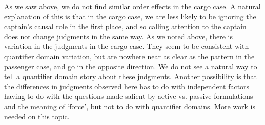 \documentclass{salt}
\begin{document}
As we saw above, we do not find similar order effects in the cargo case. A natural explanation of this is that in the cargo case, we are less likely to be ignoring the captain's causal role in the first place, and so calling attention to the captain does not change judgments in the same way. As we noted above, there is variation in the judgments in the cargo case. They seem to be consistent with quantifier domain variation, but are nowhere near as clear as the pattern in the passenger case, and go in the opposite direction. We do not see a natural way to tell a quantifier domain story about these judgments. Another possibility is that the differences in judgments observed here has to do with independent factors having to do with the questions made salient by active vs. passive formulations and the meaning of `force', but not to do with quantifier domains. More work is needed on this topic.

\end{document}
